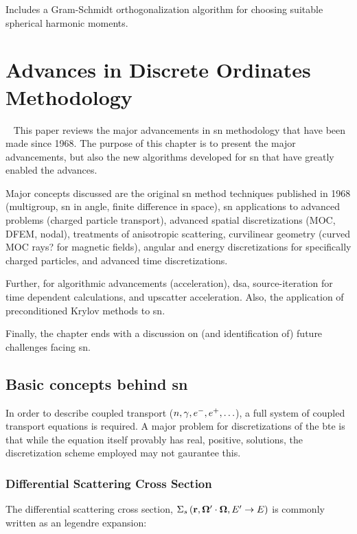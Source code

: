 Includes a Gram-Schmidt orthogonalization algorithm for choosing suitable spherical harmonic moments.

\clearpage
\section{Advances in Discrete Ordinates Methodology}
~\cite{larsen_advances_2010}
This paper reviews the major advancements in \gls{sn} methodology that have been made since 1968. The purpose of this chapter is to present the major advancements, but also the new algorithms developed for \gls{sn} that have greatly enabled the advances. 

Major concepts discussed are the original \gls{sn} method techniques published in 1968 (multigroup, \gls{sn} in angle, finite difference in space), \gls{sn} applications to advanced problems (charged particle transport), advanced spatial discretizations (MOC, DFEM, nodal), treatments of anisotropic scattering, curvilinear geometry (curved MOC rays? for magnetic fields), angular and energy discretizations for specifically charged particles, and advanced time discretizations. 

Further, for algorithmic advancements (acceleration), \gls{dsa}, source-iteration for time dependent calculations, and upscatter acceleration. Also, the application of preconditioned Krylov methods to \gls{sn}. 

Finally, the chapter ends with a discussion on (and identification of) future challenges facing \gls{sn}.

\subsection{Basic concepts behind \gls{sn}}
In order to describe coupled transport ($n, \gamma, e^{-}, e^{+},\ldots$), a full system of coupled transport equations is required. A major problem for discretizations of the \gls{bte} is that while the equation itself provably has real, positive, solutions, the discretization scheme employed may not gaurantee this. 

\subsubsection{Differential Scattering Cross Section}
The differential scattering cross section, $\Sigma_{s}\left(\mathbf{r}, \bm{\Omega}'\cdot\bm{\Omega}, E'\rightarrow E\right)$ is commonly written as an legendre expansion:

